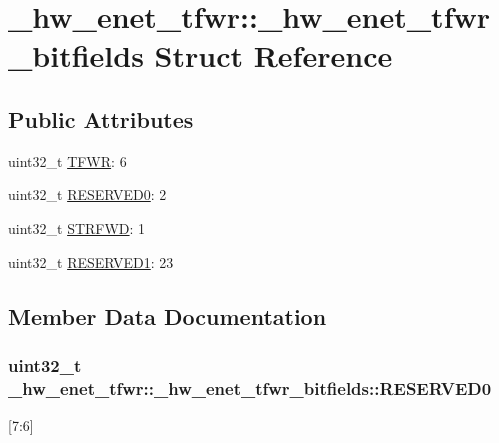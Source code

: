 \hypertarget{struct__hw__enet__tfwr_1_1__hw__enet__tfwr__bitfields}{}\section{\+\_\+hw\+\_\+enet\+\_\+tfwr\+:\+:\+\_\+hw\+\_\+enet\+\_\+tfwr\+\_\+bitfields Struct Reference}
\label{struct__hw__enet__tfwr_1_1__hw__enet__tfwr__bitfields}
\subsection*{Public Attributes}
\begin{DoxyCompactItemize}
\item 
uint32\+\_\+t \hyperlink{struct__hw__enet__tfwr_1_1__hw__enet__tfwr__bitfields_a478f7685818e2d935d52282a227a5086}{T\+F\+WR}\+: 6
\item 
uint32\+\_\+t \hyperlink{struct__hw__enet__tfwr_1_1__hw__enet__tfwr__bitfields_a24174e3454a1ed3654b88e8475c6c048}{R\+E\+S\+E\+R\+V\+E\+D0}\+: 2
\item 
uint32\+\_\+t \hyperlink{struct__hw__enet__tfwr_1_1__hw__enet__tfwr__bitfields_a5e58654f0872e5796703656027952df8}{S\+T\+R\+F\+WD}\+: 1
\item 
uint32\+\_\+t \hyperlink{struct__hw__enet__tfwr_1_1__hw__enet__tfwr__bitfields_a62797bbc447b7495bcc749c7747dd561}{R\+E\+S\+E\+R\+V\+E\+D1}\+: 23
\end{DoxyCompactItemize}


\subsection{Member Data Documentation}
\subsubsection[{\texorpdfstring{R\+E\+S\+E\+R\+V\+E\+D0}{RESERVED0}}]{\setlength{\rightskip}{0pt plus 5cm}uint32\+\_\+t \+\_\+hw\+\_\+enet\+\_\+tfwr\+::\+\_\+hw\+\_\+enet\+\_\+tfwr\+\_\+bitfields\+::\+R\+E\+S\+E\+R\+V\+E\+D0}\hypertarget{struct__hw__enet__tfwr_1_1__hw__enet__tfwr__bitfields_a24174e3454a1ed3654b88e8475c6c048}{}\label{struct__hw__enet__tfwr_1_1__hw__enet__tfwr__bitfields_a24174e3454a1ed3654b88e8475c6c048}
\mbox{[}7\+:6\mbox{]} 
